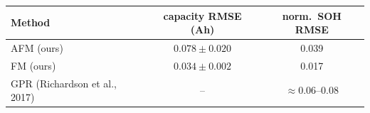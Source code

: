 \begin{tabular}{lcc}
\toprule
Method & capacity RMSE (Ah) & norm.\ SOH RMSE \\
\midrule
AFM (ours) & $0.078\!\pm\!0.020$ & 0.039 \\
FM (ours) & $0.034\!\pm\!0.002$ & 0.017 \\
GPR (Richardson et al., 2017) & -- & $\approx$0.06--0.08 \\
\bottomrule
\end{tabular}